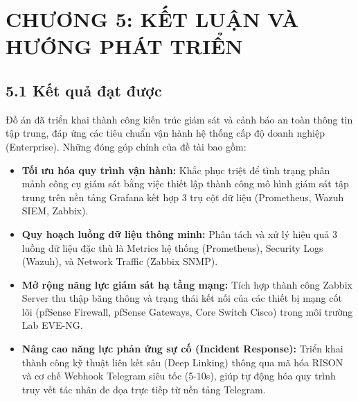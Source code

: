 \documentclass[13pt,a4paper]{extarticle}
\begin{document}
\section{CHƯƠNG 5: KẾT LUẬN VÀ HƯỚNG PHÁT TRIỂN}

\subsection{5.1 Kết quả đạt được}
Đồ án đã triển khai thành công kiến trúc giám sát và cảnh báo an toàn thông tin tập trung, đáp ứng các tiêu chuẩn vận hành hệ thống cấp độ doanh nghiệp (Enterprise). Những đóng góp chính của đề tài bao gồm:
\begin{itemize}
    \item \textbf{Tối ưu hóa quy trình vận hành:} Khắc phục triệt để tình trạng phân mảnh công cụ giám sát bằng việc thiết lập thành công mô hình giám sát tập trung trên nền tảng Grafana kết hợp 3 trụ cột dữ liệu (Prometheus, Wazuh SIEM, Zabbix).
    \item \textbf{Quy hoạch luồng dữ liệu thông minh:} Phân tách và xử lý hiệu quả 3 luồng dữ liệu đặc thù là Metrics hệ thống (Prometheus), Security Logs (Wazuh), và Network Traffic (Zabbix SNMP).
    \item \textbf{Mở rộng năng lực giám sát hạ tầng mạng:} Tích hợp thành công Zabbix Server thu thập băng thông và trạng thái kết nối của các thiết bị mạng cốt lõi (pfSense Firewall, pfSense Gateways, Core Switch Cisco) trong môi trường Lab EVE-NG.
    \item \textbf{Nâng cao năng lực phản ứng sự cố (Incident Response):} Triển khai thành công kỹ thuật liên kết sâu (Deep Linking) thông qua mã hóa RISON và cơ chế Webhook Telegram siêu tốc (5-10s), giúp tự động hóa quy trình truy vết tác nhân đe dọa trực tiếp từ nền tảng Telegram.
\end{itemize}
\end{document}

